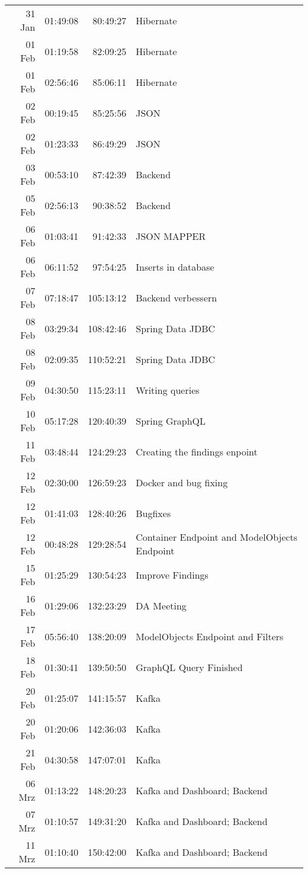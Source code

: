 \begin{longtable}{r | r | r | p{}}
	 31 Jan & 01:49:08 & 80:49:27 & Hibernate \\ 
	 01 Feb & 01:19:58 & 82:09:25 & Hibernate \\ 
	 01 Feb & 02:56:46 & 85:06:11 & Hibernate \\ 
	 02 Feb & 00:19:45 & 85:25:56 & JSON \\ 
	 02 Feb & 01:23:33 & 86:49:29 & JSON \\ 
	 03 Feb & 00:53:10 & 87:42:39 & Backend \\ 
	 05 Feb & 02:56:13 & 90:38:52 & Backend \\ 
	 06 Feb & 01:03:41 & 91:42:33 & JSON MAPPER \\ 
	 06 Feb & 06:11:52 & 97:54:25 & Inserts in database \\ 
	 07 Feb & 07:18:47 & 105:13:12 & Backend verbessern \\ 
	 08 Feb & 03:29:34 & 108:42:46 & Spring Data JDBC \\ 
	 08 Feb & 02:09:35 & 110:52:21 & Spring Data JDBC \\ 
	 09 Feb & 04:30:50 & 115:23:11 & Writing queries \\ 
	 10 Feb & 05:17:28 & 120:40:39 & Spring GraphQL \\ 
	 11 Feb & 03:48:44 & 124:29:23 & Creating the findings enpoint \\ 
	 12 Feb & 02:30:00 & 126:59:23 & Docker and bug fixing \\ 
	 12 Feb & 01:41:03 & 128:40:26 & Bugfixes \\ 
	 12 Feb & 00:48:28 & 129:28:54 & Container Endpoint and ModelObjects Endpoint \\ 
	 15 Feb & 01:25:29 & 130:54:23 & Improve Findings \\ 
	 16 Feb & 01:29:06 & 132:23:29 & DA Meeting \\ 
	 17 Feb & 05:56:40 & 138:20:09 & ModelObjects Endpoint and Filters \\ 
	 18 Feb & 01:30:41 & 139:50:50 & GraphQL Query Finished \\ 
	 20 Feb & 01:25:07 & 141:15:57 & Kafka \\ 
	 20 Feb & 01:20:06 & 142:36:03 & Kafka \\ 
	 21 Feb & 04:30:58 & 147:07:01 & Kafka \\ 
	 06 Mrz & 01:13:22 & 148:20:23 & Kafka and Dashboard; Backend \\ 
	 07 Mrz & 01:10:57 & 149:31:20 & Kafka and Dashboard; Backend \\ 
	 11 Mrz & 01:10:40 & 150:42:00 & Kafka and Dashboard; Backend \\ 

\end{longtable}
